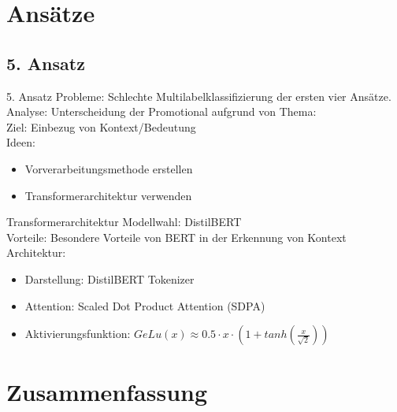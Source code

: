 \documentclass[aspectratio=169]{beamer} %
\begin{document}
\section{Ansätze}

\subsection{5. Ansatz}

\begin{frame}
    \begin{block}{5. Ansatz}
        Probleme: Schlechte Multilabelklassifizierung der ersten vier Ansätze. \\
        Analyse: Unterscheidung der Promotional aufgrund von Thema: \\
        Ziel:
        Einbezug von Kontext/Bedeutung \\
        Ideen:
      \begin{itemize}
      \item Vorverarbeitungsmethode erstellen
      \item Transformerarchitektur verwenden
      \end{itemize}      
    \end{block}
\end{frame}

\begin{frame}
    \begin{block}{Transformerarchitektur}
     Modellwahl: DistilBERT \\
        Vorteile: Besondere Vorteile von BERT in der Erkennung von Kontext \\
        Architektur:
\begin{itemize}
	\item Darstellung: DistilBERT Tokenizer
     \item Attention: Scaled Dot Product Attention (SDPA)
            \item Aktivierungsfunktion: $GeLu(x) \approx {0.5 \cdot x \cdot (1+ tanh({\frac{x}{\sqrt{2}}}))} $
\end{itemize}        
    \end{block}
\end{frame}

\section{Zusammenfassung}
\end{document}
